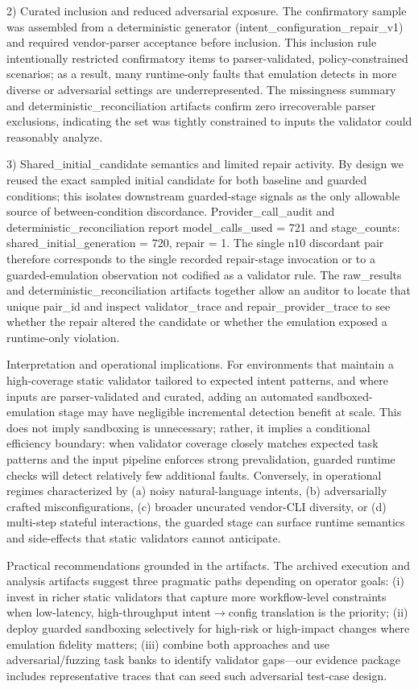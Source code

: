\documentclass[conference]{IEEEtran}
\begin{document}
2) Curated inclusion and reduced adversarial exposure. The confirmatory sample was assembled from a deterministic generator (intent\_configuration\_repair\_v1) and required vendor-parser acceptance before inclusion. This inclusion rule intentionally restricted confirmatory items to parser-validated, policy-constrained scenarios; as a result, many runtime-only faults that emulation detects in more diverse or adversarial settings are underrepresented. The missingness summary and deterministic\_reconciliation artifacts confirm zero irrecoverable parser exclusions, indicating the set was tightly constrained to inputs the validator could reasonably analyze.

3) Shared\_initial\_candidate semantics and limited repair activity. By design we reused the exact sampled initial candidate for both baseline and guarded conditions; this isolates downstream guarded-stage signals as the only allowable source of between-condition discordance. Provider\_call\_audit and deterministic\_reconciliation report model\_calls\_used = 721 and stage\_counts: shared\_initial\_generation = 720, repair = 1. The single n10 discordant pair therefore corresponds to the single recorded repair-stage invocation or to a guarded-emulation observation not codified as a validator rule. The raw\_results and deterministic\_reconciliation artifacts together allow an auditor to locate that unique pair\_id and inspect validator\_trace and repair\_provider\_trace to see whether the repair altered the candidate or whether the emulation exposed a runtime-only violation.

Interpretation and operational implications. For environments that maintain a high-coverage static validator tailored to expected intent patterns, and where inputs are parser-validated and curated, adding an automated sandboxed-emulation stage may have negligible incremental detection benefit at scale. This does not imply sandboxing is unnecessary; rather, it implies a conditional efficiency boundary: when validator coverage closely matches expected task patterns and the input pipeline enforces strong prevalidation, guarded runtime checks will detect relatively few additional faults. Conversely, in operational regimes characterized by (a) noisy natural-language intents, (b) adversarially crafted misconfigurations, (c) broader uncurated vendor-CLI diversity, or (d) multi-step stateful interactions, the guarded stage can surface runtime semantics and side-effects that static validators cannot anticipate.

Practical recommendations grounded in the artifacts. The archived execution and analysis artifacts suggest three pragmatic paths depending on operator goals: (i) invest in richer static validators that capture more workflow-level constraints when low-latency, high-throughput intent\ensuremath{\rightarrow}config translation is the priority; (ii) deploy guarded sandboxing selectively for high-risk or high-impact changes where emulation fidelity matters; (iii) combine both approaches and use adversarial/fuzzing task banks to identify validator gaps---our evidence package includes representative traces that can seed such adversarial test-case design.
\end{document}

